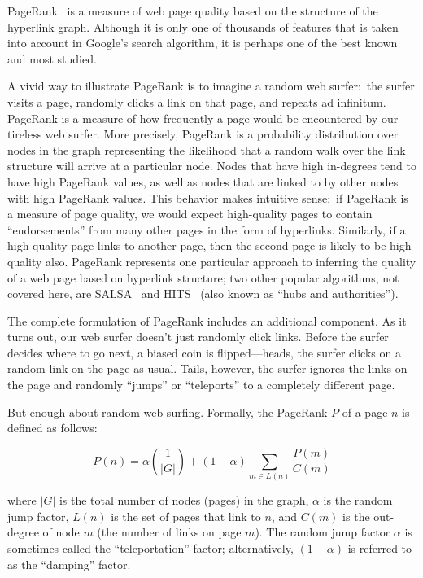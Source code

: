 PageRank~\cite{Page_etal_1999} is a measure of web page quality based
on the structure of the hyperlink graph.  Although it is only one of
thousands of features that is taken into account in Google's search
algorithm, it is perhaps one of the best known and most studied.

A vivid way to illustrate PageRank is to imagine a random web
surfer:\ the surfer visits a page, randomly clicks a link on that
page, and repeats ad infinitum.  PageRank is a measure of how
frequently a page would be encountered by our tireless web surfer.
More precisely, PageRank is a probability distribution over nodes in
the graph representing the likelihood that a random walk over the link
structure will arrive at a particular node.  Nodes that have high
in-degrees tend to have high PageRank values, as well as nodes that
are linked to by other nodes with high PageRank values.  This behavior
makes intuitive sense:\ if PageRank is a measure of page quality, we
would expect high-quality pages to contain ``endorsements'' from many
other pages in the form of hyperlinks.  Similarly, if a high-quality
page links to another page, then the second page is likely to be high
quality also.  PageRank represents one particular approach to
inferring the quality of a web page based on hyperlink structure; two
other popular algorithms, not covered here, are
SALSA~\cite{Lempel_Moran_TOIS2001} and HITS~\cite{Kleinberg_JACM1999}
(also known as ``hubs and authorities'').

The complete formulation of PageRank includes an additional component.
As it turns out, our web surfer doesn't just randomly click links.
Before the surfer decides where to go next, a biased coin is
flipped---heads, the surfer clicks on a random link on the page as
usual.  Tails, however, the surfer ignores the links on the page and
randomly ``jumps'' or ``teleports'' to a completely different page.

But enough about random web surfing.  Formally, the PageRank $P$ of a
page $n$ is defined as follows:

\begin{equation}
P(n) = \alpha \left( \frac{1}{|G|} \right) + (1-\alpha) \sum_{m \in L(n)} \frac{P(m)}{C(m)}
\end{equation}

\noindent where $|G|$ is the total number of nodes (pages) in the
graph, $\alpha$ is the random jump factor, $L(n)$ is the set of pages
that link to $n$, and $C(m)$ is the out-degree of node $m$ (the number
of links on page $m$).  The random jump factor $\alpha$ is sometimes
called the ``teleportation'' factor; alternatively, $(1-\alpha)$ is
referred to as the ``damping'' factor.

